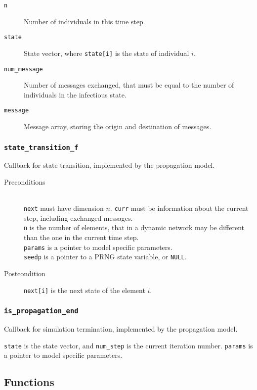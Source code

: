 \begin{description}
 \item[\texttt{n}] Number of individuals in this time step.
 \item[\texttt{state}] State vector, where \texttt{state[i]} is the state of 
   individual $i$.
 \item[\texttt{num\_message}] Number of messages exchanged, that must be equal
   to the number of individuals in the infectious state.
 \item[\texttt{message}] Message array, storing the origin and destination of 
   messages.
\end{description}

\subsubsection{\texttt{state\_transition\_f}}

Callback for state transition, implemented by the propagation model.

\begin{description}
 \item[Preconditions]~\\
   \texttt{next} must have dimension $n$.
   \texttt{curr} must be information about the current step, including exchanged
   messages.\\
   \texttt{n} is the number of elements, that in a dynamic network may be 
   different than the one in the current time step.\\
   \texttt{params} is a pointer to model specific parameters.\\
   \texttt{seedp} is a pointer to a PRNG state variable, or \texttt{NULL}.
 \item[Postcondition] \texttt{next[i]} is the next state of the element $i$.
\end{description}

\subsubsection{\texttt{is\_propagation\_end}}

Callback for simulation termination, implemented by the propagation model.

\texttt{state} is the state vector, and \texttt{num\_step} is the current
iteration number. \texttt{params} is a pointer to model specific parameters.

\subsection{Functions}

